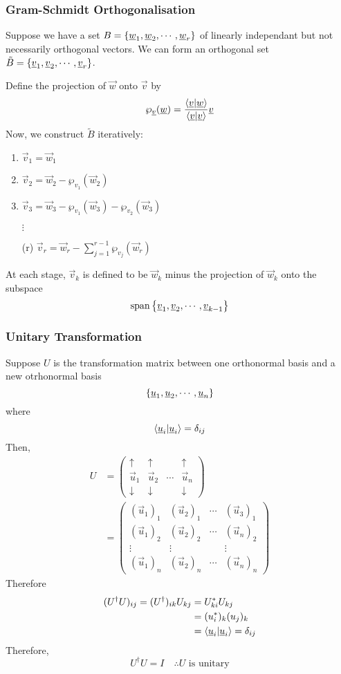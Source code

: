 \documentclass{article}
\numberwithin{equation}{section}
\begin{document}
\subsubsection{Gram-Schmidt Orthogonalisation}
Suppose we have a set $B = \left\{ \underline{w}_1, \underline{w}_2, \cdots, \underline{w}_r \right\}$ of linearly independant but not necessarily orthogonal vectors. 
We can form an orthogonal set $\tilde{B} = \left\{ \underline{v}_1, \underline{v}_2, \cdots, \underline{v}_r \right\}$.

Define the projection of $\vec w$ onto $\vec v$ by
\[
    \wp_{\underline{v}}(\underline{w}) = \frac{\left\langle \underline{v}\middle\vert \underline{w} \right\rangle}{\left\langle \underline{v}\middle\vert \underline{v} \right\rangle} \underline{v}   
\]
Now, we construct $\tilde{B}$ iteratively:
\begin{enumerate}
    \item $\vec v_1 = \vec w_1$
    \item $\vec v_2 = \vec w_2 - \wp_{v_1}(\vec w_2)$
    \item $\vec v_3 = \vec w_3 - \wp_{v_1}(\vec w_3) - \wp_{v_2}(\vec w_3)$
    \item[{$\vdots$}] 
    \item[(r)] $\vec v_r = \vec w_r - \sum_{j=1}^{r-1}\wp_{v_j}(\vec w_r)$
\end{enumerate}
At each stage, $\vec v_k$ is defined to be $\vec w_k$ minus the projection of $\vec w_k$ onto the subspace
\[
    \operatorname{span} \left\{ \underline{v}_1, \underline{v}_2, \cdots, \underline{v}_{k-1} \right\}
\]
\subsubsection{Unitary Transformation}
Suppose $U$ is the transformation matrix between one orthonormal basis and a new otrhonormal basis
\[
    \left\{ \underline{u}_1, \underline{u}_2, \cdots, \underline{u}_n \right\}
\]
where
\[
    \left\langle \underline{u}_i\middle\vert \underline{u}_i \right\rangle = \delta_{ij}
\]
Then, 
\begin{align*}
    U &= \begin{pmatrix}
        \uparrow & \uparrow & & \uparrow \\
        \vec u_1 & \vec u_2 & \cdots & \vec u_n \\
        \downarrow & \downarrow & & \downarrow
    \end{pmatrix} \\[10pt]
    &= \begin{pmatrix}
        (\vec u_1)_1 & (\vec u_2)_1 & \cdots & (\vec u_3)_1 \\
        (\vec u_1)_2 & (\vec u_2)_2 & \cdots & (\vec u_n)_2 \\
        \vdots & \vdots & & \vdots \\
        (\vec u_1)_n & (\vec u_2)_n & \cdots & (\vec u_n)_n
    \end{pmatrix}
\end{align*}
Therefore
\begin{align*}
    (U^\dagger U)_{ij} = (U^\dagger)_{ik} U_{kj} &= U^*_{ki} U_{kj} \\
    &= (u^*_i)_k (u_j)_k \\
    &= \left\langle \underline{u}_i\middle\vert \underline{u}_i \right\rangle = \delta_{ij}
\end{align*}
Therefore,
\[
    U^\dagger U = I \quad \therefore U \text{ is unitary}
\]
\end{document}
